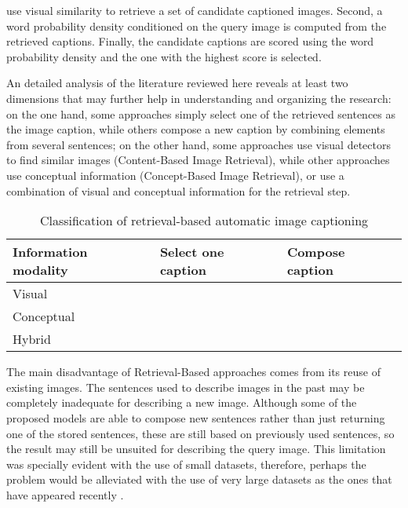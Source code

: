 \citet{Mason2015} use visual similarity to retrieve a set of candidate captioned images. Second, a word probability density conditioned on the query image is computed from the retrieved captions. Finally, the candidate captions are scored using the word probability density and the one with the highest score is selected. 

An detailed analysis of the literature reviewed here reveals at least two dimensions that may further help in understanding and organizing the research: on the one hand, some approaches simply select one of the retrieved sentences as the image caption, while others compose a new caption by combining elements from several sentences; on the other hand, some approaches use visual detectors to find similar images (Content-Based Image Retrieval), while other approaches use conceptual information (Concept-Based Image Retrieval), or use a combination of visual and conceptual information for the retrieval step.

\begin{table}[hpt]
    \caption{Classification of retrieval-based automatic image captioning}
    \label{tab:retrieval-classification}
    \begin{tabular}{p{40mm}|p{60mm}|p{60mm}}
        Information modality & Select one caption & Compose caption \\
        \hline
        Visual & \citet{Farhadi2010, Mason2015} & \cite{Gupta2012} \\
        \hline
        Conceptual &  \cite{Ordonez2011} & \citet{Kuznetsova2012, Kuznetsova2014} \\
        \hline
        Hybrid &  \citet{Hodosh2013b}\\

    \end{tabular}
\end{table}

The main disadvantage of Retrieval-Based approaches comes from its reuse of existing images. The sentences used to describe images in the past may be completely inadequate for describing a new image. Although some of the proposed models are able to compose new sentences rather than just returning one of the stored sentences, these are still based on previously used sentences, so the result may still be unsuited for describing the query image. This limitation was specially evident with the use of small datasets, therefore, perhaps the problem would be alleviated with the use of very large datasets as the ones that have appeared recently \citet{Lin2014, Sharma2018}.


